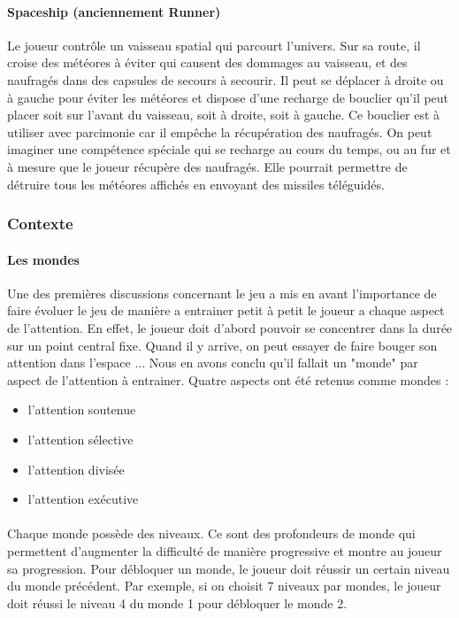 \paragraph{Spaceship (anciennement Runner)}Le joueur contrôle un vaisseau spatial qui parcourt l'univers. Sur sa route, il croise des météores à éviter qui causent des dommages au
vaisseau, et des naufragés dans des capsules de secours à secourir. Il peut se déplacer à droite ou à gauche pour éviter les météores et dispose d'une recharge de bouclier qu'il peut
placer soit sur l'avant du vaisseau, soit à droite, soit à gauche. Ce bouclier est à utiliser avec parcimonie car il empêche la récupération des naufragés. On peut imaginer une
compétence spéciale qui se recharge au cours du temps, ou au fur et à mesure que le joueur récupère des naufragés. Elle pourrait permettre de détruire tous les météores affichés en
envoyant des missiles téléguidés.


\newpage
\subsubsection{Contexte}

\paragraph{Les mondes}Une des premières discussions concernant le jeu a mis en avant l'importance de faire évoluer le jeu de manière a entrainer petit à petit le joueur a chaque aspect
de l'attention. En effet, le joueur doit d'abord pouvoir se concentrer dans la durée sur un point central fixe. Quand il y arrive, on peut essayer de faire bouger son attention dans
l'espace ... Nous en avons conclu qu'il fallait un "monde" par aspect de l'attention à entrainer. Quatre aspects ont été retenus comme mondes :
\begin{itemize}
\item l'attention soutenue
\item l'attention sélective
\item l'attention divisée
\item l'attention exécutive
\end{itemize}

\paragraph{}Chaque monde possède des niveaux. Ce sont des profondeurs de monde qui permettent d'augmenter la difficulté de manière progressive et montre au joueur sa progression.
Pour débloquer un monde, le joueur doit réussir un certain niveau du monde précédent. Par exemple, si on choisit 7 niveaux par mondes, le joueur doit réussi le niveau 4 du monde 1
pour débloquer le monde 2.

